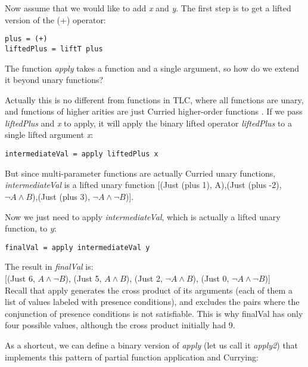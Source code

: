 \documentclass[10pt,conference]{llncs}
\begin{document}
\begin{exmp}

Now assume that we would like to add \emph{x} and \emph{y}. The first step is to get a lifted version of the (+) operator:

\begin{verbatim}
plus = (+)
liftedPlus = liftT plus
\end{verbatim}

The function \emph{apply} takes a function and a single argument, so how do we extend it beyond unary functions?

Actually this is no different from functions in TLC, where all functions are unary, and functions of higher arities are just Curried higher-order functions \cite{Pierce2002}. If we pass \emph{liftedPlus} and \emph{x} to apply, it will apply the binary lifted operator \emph{liftedPlus} to a single lifted argument \emph{x}:

\begin{verbatim}
intermediateVal = apply liftedPlus x
\end{verbatim}

But since multi-parameter functions are actually Curried unary functions, \emph{intermediateVal} is a lifted unary function [(Just (plus 1), A),(Just (plus -2), $\neg A \wedge B$),(Just (plus 3), $\neg A \wedge \neg B$)].

Now we just need to apply \emph{intermediateVal}, which is actually a lifted unary function, to \emph{y}:

\begin{verbatim}
finalVal = apply intermediateVal y
\end{verbatim}

The result in \emph{finalVal} is: \\

[(Just 6, $A \wedge \neg B$), (Just 5, $A \wedge B$), (Just 2, $\neg A \wedge B$), (Just 0, $\neg A \wedge \neg B$)] \\

Recall that apply generates the cross product of its arguments (each of them a list of values labeled with presence conditions), and excludes the pairs where the conjunction of presence conditions is not satisfiable. This is why finalVal has only four possible values, although the cross product initially had 9.

As a shortcut, we can define a binary version of \emph{apply} (let us call it \emph{apply2}) that implements this pattern of partial function application and Currying:


\end{exmp}
\end{document}
